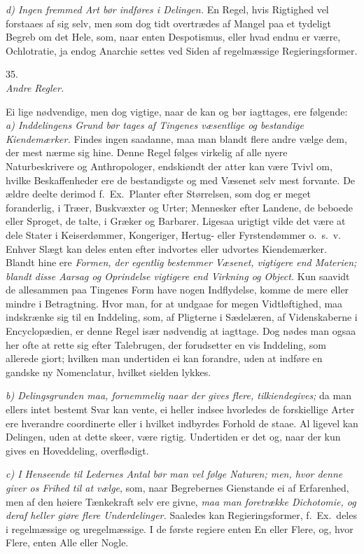 \documentclass[12pt,a4paper]{article}
\newcommand{\logsec}[2]{%
  \bigskip\begin{center}{\large #1}\\[4pt]{\emph{#2}}\end{center}\smallskip}
\newcommand{\opage}[1]{\marginnote{\footnotesize\textit{[#1]}}}
\begin{document}
\emph{d) Ingen fremmed Art bør indføres i Delingen.} En Regel, hvis Rigtighed
vel forstaaes af sig selv, men som dog tidt overtrædes af Mangel paa et tydeligt
Begreb om det Hele, som, naar enten Despotismus, eller hvad endnu er værre,
Ochlotratie, ja endog Anarchie settes ved Siden af regelmæssige
Regieringsformer.

\logsec{35.}{Andre Regler.}

\noindent
Ei lige nødvendige, men dog vigtige, naar de kan og bør iagttages, ere følgende:
\emph{a) Inddelingens Grund bør tages af Tingenes væsentlige og bestandige
Kiendemærker.} Findes ingen saadanne, maa man blandt flere andre vælge dem, der
mest nærme sig hine. Denne Regel følges virkelig af alle nyere Naturbeskrivere
og Anthropologer, endskiøndt der atter kan være Tvivl om, hvilke
\opage{106} Beskaffenheder ere de bestandigste og med Væsenet selv mest forvante. De ældre
deelte derimod f.~Ex.\ Planter efter Størrelsen, som dog er meget foranderlig, i
Træer, Buskvæxter og Urter; Mennesker efter Landene, de beboede eller Sproget,
de talte, i Græker og Barbarer. Ligesaa urigtigt vilde det være at dele Stater i
Keiserdømmer, Kongeriger, Hertug- eller Fyrstendømmer o.~s.~v. Enhver Slægt kan
deles enten efter indvortes eller udvortes Kiendemærker. Blandt hine ere
\emph{Formen, der egentlig bestemmer Væsenet, vigtigere end Materien; blandt
disse Aarsag og Oprindelse vigtigere end Virkning og Object.} Kun saavidt de
allesammen paa Tingenes Form have nogen Indflydelse, komme de mere eller mindre
i Betragtning. Hvor man, for at undgaae for megen Vidtløftighed, maa indskrænke
sig til en Inddeling, som, af Pligterne i Sædelæren, af Videnskaberne i
Encyclopædien, er denne Regel især nødvendig at iagttage. Dog nødes man ogsaa
her ofte at rette sig efter Talebrugen, der forudsetter en vis Inddeling, som
allerede giort; hvilken man undertiden ei kan forandre, uden at indføre en
gandske ny Nomenclatur, hvilket sielden lykkes.

\emph{b) Delingsgrunden maa, fornemmelig naar der gives flere, tilkiendegives;}
da man ellers intet bestemt Svar kan vente, ei heller indsee hvorledes de
forskiellige Arter ere hverandre coordinerte eller i hvilket indbyrdes Forhold
de staae. Al%
\opage{107}ligevel kan Delingen, uden at dette skeer, være rigtig. Undertiden er det og,
naar der kun gives en Hoveddeling, overflødigt.

\emph{c) I Henseende til Ledernes Antal bør man vel følge Naturen; men, hvor
denne giver os Frihed til at vælge}, som, naar Begrebernes Gienstande ei af
Erfarenhed, men af den høiere Tænkekraft selv ere givne, \emph{maa man
foretrække Dichotomie, og deraf heller giøre flere Underdelinger.} Saaledes kan
Regieringsformer, f.~Ex.\ deles i regelmæssige og uregelmæssige. I de første
regiere enten En eller Flere, og, hvor Flere, enten Alle eller Nogle.
\end{document}
